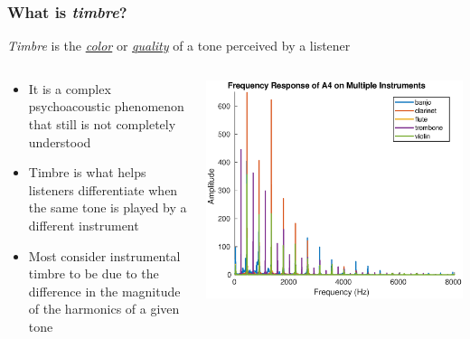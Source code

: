 \documentclass[aspectratio=1610]{beamer}
\begin{document}
\begin{frame}
\frametitle{What is \textit{timbre}?}
\textit{Timbre} is the \textit{\underline{color}} or \textit{\underline{quality}} of a tone perceived by a listener

\begin{columns}
\begin{column}{0.4\textwidth}
\begin{itemize}[label = $\blacktriangleright$]
\item It is a complex psychoacoustic phenomenon that still is not completely understood \vspace{.5em}

\item Timbre is what helps listeners differentiate when the same tone is played by a different instrument \vspace{.5em}

\item Most consider instrumental timbre to be due to the difference in the magnitude of the harmonics of a given tone
\end{itemize}
\end{column}
\begin{column}{0.6\textwidth}
\includegraphics[width = 1.0\textwidth]{fft_all}
\end{column}
\end{columns}

\end{frame}
\end{document}
